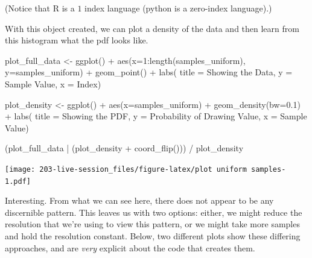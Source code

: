 \documentclass[
]{book}
\newenvironment{Shaded}{\begin{snugshade}}{\end{snugshade}}
\newcommand{\AttributeTok}[1]{\textcolor[rgb]{0.77,0.63,0.00}{#1}}
\newcommand{\DecValTok}[1]{\textcolor[rgb]{0.00,0.00,0.81}{#1}}
\newcommand{\FloatTok}[1]{\textcolor[rgb]{0.00,0.00,0.81}{#1}}
\newcommand{\FunctionTok}[1]{\textcolor[rgb]{0.00,0.00,0.00}{#1}}
\newcommand{\NormalTok}[1]{#1}
\newcommand{\OtherTok}[1]{\textcolor[rgb]{0.56,0.35,0.01}{#1}}
\newcommand{\SpecialCharTok}[1]{\textcolor[rgb]{0.00,0.00,0.00}{#1}}
\newcommand{\StringTok}[1]{\textcolor[rgb]{0.31,0.60,0.02}{#1}}
\theoremstyle{definition}
\theoremstyle{definition}
\theoremstyle{definition}
\theoremstyle{definition}
\theoremstyle{remark}
\begin{document}
(Notice that R is a \(1\) index language (python is a zero-index language).)

With this object created, we can plot a density of the data and then learn from this histogram what the pdf looks like.

\begin{Shaded}
\begin{Highlighting}[]
\NormalTok{plot\_full\_data }\OtherTok{\textless{}{-}} \FunctionTok{ggplot}\NormalTok{() }\SpecialCharTok{+} 
  \FunctionTok{aes}\NormalTok{(}\AttributeTok{x=}\DecValTok{1}\SpecialCharTok{:}\FunctionTok{length}\NormalTok{(samples\_uniform), }\AttributeTok{y=}\NormalTok{samples\_uniform) }\SpecialCharTok{+} 
  \FunctionTok{geom\_point}\NormalTok{()  }\SpecialCharTok{+} 
  \FunctionTok{labs}\NormalTok{(}
    \AttributeTok{title =} \StringTok{\textquotesingle{}Showing the Data\textquotesingle{}}\NormalTok{, }
    \AttributeTok{y     =} \StringTok{\textquotesingle{}Sample Value\textquotesingle{}}\NormalTok{, }
    \AttributeTok{x     =} \StringTok{\textquotesingle{}Index\textquotesingle{}}\NormalTok{)}

\NormalTok{plot\_density }\OtherTok{\textless{}{-}} \FunctionTok{ggplot}\NormalTok{() }\SpecialCharTok{+} 
  \FunctionTok{aes}\NormalTok{(}\AttributeTok{x=}\NormalTok{samples\_uniform) }\SpecialCharTok{+} 
  \FunctionTok{geom\_density}\NormalTok{(}\AttributeTok{bw=}\FloatTok{0.1}\NormalTok{)   }\SpecialCharTok{+} 
  \FunctionTok{labs}\NormalTok{(}
    \AttributeTok{title =} \StringTok{\textquotesingle{}Showing the PDF\textquotesingle{}}\NormalTok{, }
    \AttributeTok{y     =} \StringTok{\textquotesingle{}Probability of Drawing Value\textquotesingle{}}\NormalTok{, }
    \AttributeTok{x     =} \StringTok{\textquotesingle{}Sample Value\textquotesingle{}}\NormalTok{)}

\NormalTok{(plot\_full\_data }\SpecialCharTok{|}\NormalTok{ (plot\_density }\SpecialCharTok{+} \FunctionTok{coord\_flip}\NormalTok{())) }\SpecialCharTok{/} 
\NormalTok{  plot\_density }
\end{Highlighting}
\end{Shaded}

\texttt{[image: 203-live-session\_files/figure-latex/plot uniform samples-1.pdf]}

Interesting. From what we can see here, there does not appear to be any discernible pattern. This leaves us with two options: either, we might reduce the resolution that we're using to view this pattern, or we might take more samples and hold the resolution constant. Below, two different plots show these differing approaches, and are \emph{very} explicit about the code that creates them.
\end{document}
